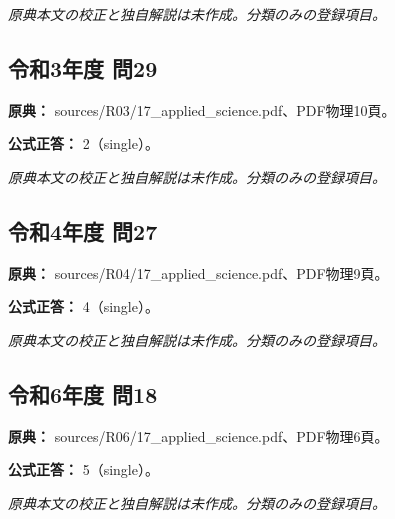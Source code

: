 \par\textit{原典本文の校正と独自解説は未作成。分類のみの登録項目。}

\subsection{令和3年度 問29}
\label{q:r03-reg-applied-29}

\noindent\textbf{原典：} sources/R03/17\_applied\_science.pdf、PDF物理10頁。

\textbf{公式正答：} 2（single）。

\par\textit{原典本文の校正と独自解説は未作成。分類のみの登録項目。}

\subsection{令和4年度 問27}
\label{q:r04-reg-applied-27}

\noindent\textbf{原典：} sources/R04/17\_applied\_science.pdf、PDF物理9頁。

\textbf{公式正答：} 4（single）。

\par\textit{原典本文の校正と独自解説は未作成。分類のみの登録項目。}

\subsection{令和6年度 問18}
\label{q:r06-reg-applied-18}

\noindent\textbf{原典：} sources/R06/17\_applied\_science.pdf、PDF物理6頁。

\textbf{公式正答：} 5（single）。

\par\textit{原典本文の校正と独自解説は未作成。分類のみの登録項目。}
